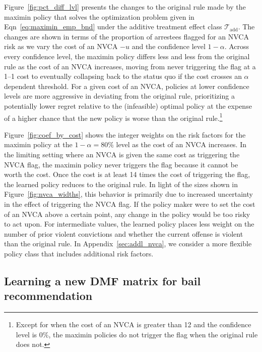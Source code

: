 \documentclass[12pt]{article}
\theoremstyle{definition}
\newcommand{\<}{\langle}
\renewcommand{\>}{\rangle}
\newcommand\mcal[1]{\ensuremath{\mathcal{#1}}}
\begin{document}
Figure~\ref{fig:pct_diff_lvl} presents the changes to the original
rule made by the maximin policy that solves the optimization problem
given in Eqn~\eqref{eq:maximin_emp_bnd} under the additive treatment
effect class $\mcal{T}_{\text{add}}$.  The changes are shown in terms
of the proportion of arrestees flagged for an NVCA risk as we vary the
cost of an NVCA $-u$ and the confidence level $1 - \alpha$.  Across
every confidence level, the maximin policy differs less and less from
the original rule as the cost of an NVCA increases, moving from never
triggering the flag at a 1--1 cost to eventually collapsing back to the
status quo if the cost crosses an $\alpha$ dependent threshold.  For a
given cost of an NVCA, policies at lower confidence levels are more
aggressive in deviating from the original rule, prioritizing a
potentially lower regret relative to the (infeasible) optimal policy
at the expense of a higher chance that the new policy is worse than
the original rule.\footnote{Except for when the cost of an NVCA is
  greater than 12 and the confidence level is 0\%, the maximin
  policies do not trigger the flag when the original rule does not.}






Figure~\ref{fig:coef_by_cost} shows the integer weights on the risk
factors for the maximin policy at the $1 - \alpha = 80\%$ level as the
cost of an NVCA increases. In the limiting setting where an NVCA is
given the same cost as triggering the NVCA flag, the maximin policy
never triggers the flag because it cannot be worth the cost.  Once the
cost is at least 14 times the cost of triggering the flag, the learned
policy reduces to the original rule.  In light of the sizes shown in
Figure~\ref{fig:nvca_widths}, this behavior is primarily due to
increased uncertainty in the effect of triggering the NVCA flag.  If
the policy maker were to set the cost of an NVCA above a certain
point, any change in the policy would be too risky to act upon.  For
intermediate values, the learned policy places less weight on the
number of prior violent convictions and whether the current offense is
violent than the original rule.
In Appendix~\ref{sec:addl_nvca}, we consider a more flexible policy
class that includes additional risk factors.





\subsection{Learning a new DMF matrix for bail recommendation}
\label{sec:dmf_matrix}
\end{document}
